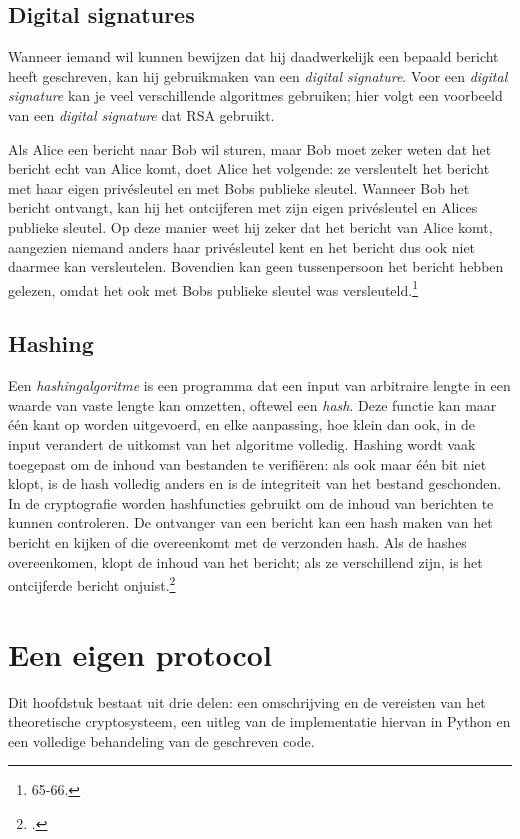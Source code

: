 \documentclass{report} %
\begin{document}
\section{Digital signatures}
Wanneer iemand wil kunnen bewijzen dat hij daadwerkelijk een bepaald bericht heeft geschreven, kan hij gebruikmaken van een \textit{digital signature}. Voor een \textit{digital signature} kan je veel verschillende algoritmes gebruiken; hier volgt een voorbeeld van een \textit{digital signature} dat RSA gebruikt.
\par Als Alice een bericht naar Bob wil sturen, maar Bob moet zeker weten dat het bericht echt van Alice komt, doet Alice het volgende: ze versleutelt het bericht met haar eigen privésleutel en met Bobs publieke sleutel. Wanneer Bob het bericht ontvangt, kan hij het ontcijferen met zijn eigen privésleutel en Alices publieke sleutel. Op deze manier weet hij zeker dat het bericht van Alice komt, aangezien niemand anders haar privésleutel kent en het bericht dus ook niet daarmee kan versleutelen. Bovendien kan geen tussenpersoon het bericht hebben gelezen, omdat het ook met Bobs publieke sleutel was versleuteld.\footnote{\cite{cryptografie} 65-66.}

\section{Hashing}
Een \textit{hashingalgoritme} is een programma dat een input van arbitraire lengte in een waarde van vaste lengte kan omzetten, oftewel een \textit{hash}. Deze functie kan maar één kant op worden uitgevoerd, en elke aanpassing, hoe klein dan ook, in de input verandert de uitkomst van het algoritme volledig. Hashing wordt vaak toegepast om de inhoud van bestanden te verifiëren: als ook maar één bit niet klopt, is de hash volledig anders en is de integriteit van het bestand geschonden. In de cryptografie worden hashfuncties gebruikt om de inhoud van berichten te kunnen controleren. De ontvanger van een bericht kan een hash maken van het bericht en kijken of die overeenkomt met de verzonden hash. Als de hashes overeenkomen, klopt de inhoud van het bericht; als ze verschillend zijn, is het ontcijferde bericht onjuist.\footnote{\cite{hashing}.}

\chapter{Een eigen protocol}
Dit hoofdstuk bestaat uit drie delen: een omschrijving en de vereisten van het theoretische cryptosysteem, een uitleg van de implementatie hiervan in Python en een volledige behandeling van de geschreven code.
\end{document}
